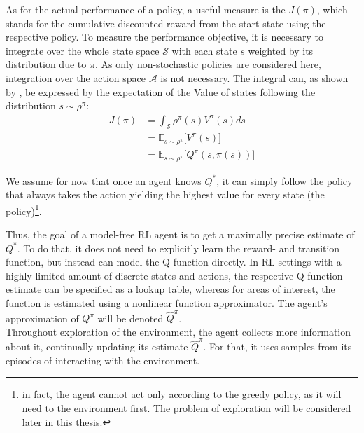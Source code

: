 As for the actual performance of a policy, a useful measure is the  $J(\pi)$, which stands for the cumulative discounted reward from the start state using the respective policy. To measure the performance objective, it is necessary to integrate over the whole state space $\mathcal{S}$ with each state $s$ weighted by its distribution due to $\pi$. As only non-stochastic policies are considered here, integration over the action space $\mathcal{A}$ is not necessary. The integral can, as shown by \cite{silver_deterministic_2014}, be expressed by the expectation of the Value of states following the distribution $s\sim\rho^\pi$:
\begin{align}
	J(\pi) &= \int_\mathcal{S} \rho^\pi(s) V^\pi(s) ds \nonumber\\
	       &= \mathds{E}_{s\sim\rho^\pi} \big[V^\pi(s)] \nonumber\\
	       &= \mathds{E}_{s\sim\rho^\pi} \big[Q^\pi(s, \pi(s))] \label{eq:performance01}
\end{align}


\noindent We assume for now that once an agent knows $Q^*$, it can simply follow the policy that always takes the action yielding the highest value for every state (the  policy)\footnote{in fact, the agent cannot act only according to the greedy policy, as it will need to  the environment first. The problem of exploration will be considered later in this thesis.}. 

Thus, the goal of a model-free RL agent is to get a maximally precise estimate of $Q^*$. To do that, it does not need to explicitly learn the reward- and transition function, but instead can model the Q-function directly. In RL settings with a highly limited amount of discrete states and actions, the respective Q-function estimate can be specified as a lookup table, whereas for areas of interest, the function is estimated using a nonlinear function approximator. The agent's approximation of $Q^\pi$ will be denoted $\hat{Q}^\pi$. \\

\noindent Throughout exploration of the environment, the agent collects more information about it, continually updating its estimate $\hat{Q}^\pi$. For that, it uses samples from its episodes of interacting with the environment. %

